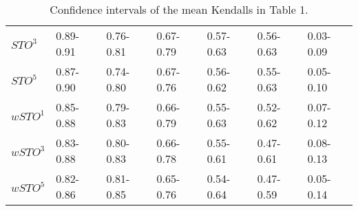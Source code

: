 \begin{table}[ht]
\begin{tabular}{lllllll}
\(\displaystyle STO^3 \) &   {\color[HTML]{00D768} 0.89-0.91} & {\color[HTML]{EF2A00} 0.76-0.81} & {\color[HTML]{0051D7} 0.67-0.79} & {\color{orange} 0.57-0.63} & {\color[HTML]{6200D7} 0.56-0.63} & {\color[HTML]{9B9B9B} 0.03-0.09} \\ 
\(\displaystyle STO^5 \) &   {\color[HTML]{00D768} 0.87-0.90} & {\color[HTML]{EF2A00} 0.74-0.80} & {\color[HTML]{0051D7} 0.67-0.76} & {\color[HTML]{6200D7} 0.56-0.62} & {\color{orange} 0.55-0.63} & {\color[HTML]{9B9B9B} 0.05-0.10} \\ 
\(\displaystyle wSTO^1 \) &   {\color[HTML]{00D768} 0.85-0.88} & {\color[HTML]{EF2A00} 0.79-0.83} & {\color[HTML]{0051D7} 0.66-0.79} & {\color[HTML]{6200D7} 0.55-0.63} & {\color{orange} 0.52-0.62} & {\color[HTML]{9B9B9B} 0.07-0.12} \\ 
\(\displaystyle wSTO^3 \) &   {\color[HTML]{00D768} 0.83-0.88} & {\color[HTML]{EF2A00} 0.80-0.83} & {\color[HTML]{0051D7} 0.66-0.78} & {\color[HTML]{6200D7} 0.55-0.61} & {\color{orange} 0.47-0.61} & {\color[HTML]{9B9B9B} 0.08-0.13} \\ 
\(\displaystyle wSTO^5 \) &   {\color[HTML]{00D768} 0.82-0.86} & {\color[HTML]{EF2A00} 0.81-0.85} & {\color[HTML]{0051D7} 0.65-0.76} & {\color[HTML]{6200D7} 0.54-0.64} & {\color{orange} 0.47-0.59} & {\color[HTML]{9B9B9B} 0.05-0.14} \\ 
\end{tabular}
\caption{Confidence intervals of the mean Kendalls in Table 1.}
\end{table}

